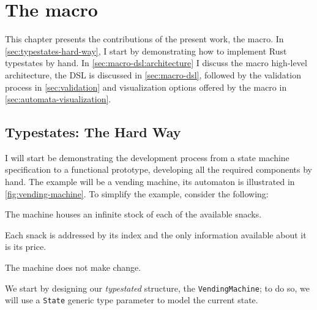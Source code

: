

\chapter{The  macro}\label{cha:macro}

This chapter presents the contributions of the present work, the \textcolor{attrgreen}{} macro.
In \autoref{sec:typestates-hard-way}, I start by demonstrating how to implement Rust typestates by hand.
In \autoref{sec:macro-dsl:architecture} I discuss the macro high-level architecture,
the DSL is discussed in \autoref{sec:macro-dsl},
followed by the validation process in \autoref{sec:validation} and
visualization options offered by the macro in \autoref{sec:automata-visualization}.

\section{Typestates: The Hard Way}\label{sec:typestates-hard-way}

I will start be demonstrating the development process from a state machine specification to a functional prototype,
developing all the required components by hand.
The example will be a vending machine, its automaton is illustrated in \autoref{fig:vending-machine}.
To simplify the example, consider the following:
\begin{compactitem}
    \item The machine houses an infinite stock of each of the available snacks.
    \item Each snack is addressed by its index and the only information available about it is its price.
    \item The machine does not make change.
\end{compactitem}




We start by designing our \emph{typestated} structure, the \texttt{VendingMachine};
to do so, we will use a \texttt{State} generic type parameter to model the current state.

